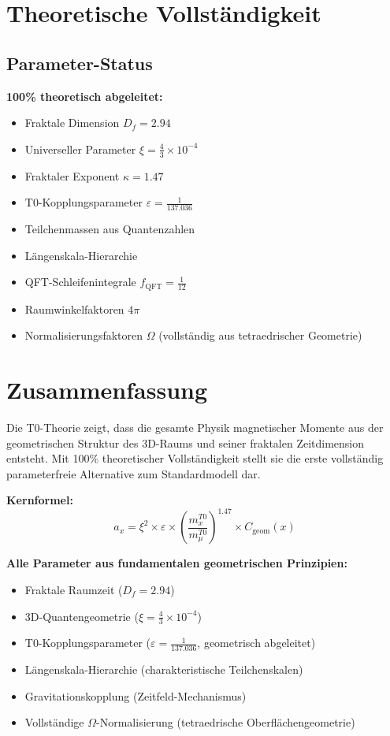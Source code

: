 \documentclass[12pt,a4paper]{article}
\numberwithin{equation}{section}
\newcommand{\xipar}{\xi}
\newcommand{\epsilonT}{\varepsilon}
\newcommand{\Cgeom}{C_{\text{geom}}}
\newcommand{\fQFT}{f_{\text{QFT}}}
\newcommand{\kappaT}{\kappa}
\newcommand{\Df}{D_f}
\newcommand{\Omegafactor}{\Omega}
\begin{document}
	\section{Theoretische Vollständigkeit}
	
	\subsection{Parameter-Status}
	
	\textbf{100\% theoretisch abgeleitet:}
	\begin{itemize}
		\item Fraktale Dimension $\Df = 2.94$
		\item Universeller Parameter $\xipar = \frac{4}{3} \times 10^{-4}$
		\item Fraktaler Exponent $\kappaT = 1.47$
		\item T0-Kopplungsparameter $\epsilonT = \frac{1}{137.036}$
		\item Teilchenmassen aus Quantenzahlen
		\item Längenskala-Hierarchie
		\item QFT-Schleifenintegrale $\fQFT = \frac{1}{12}$
		\item Raumwinkelfaktoren $4\pi$
		\item Normalisierungsfaktoren $\Omegafactor$ (vollständig aus tetraedrischer Geometrie)
	\end{itemize}
	
	\section{Zusammenfassung}
	
	Die T0-Theorie zeigt, dass die gesamte Physik magnetischer Momente aus der geometrischen Struktur des 3D-Raums und seiner fraktalen Zeitdimension entsteht. Mit 100\% theoretischer Vollständigkeit stellt sie die erste vollständig parameterfreie Alternative zum Standardmodell dar.
	
	\textbf{Kernformel:}
	\begin{equation}
		a_x = \xipar^2 \times \epsilonT \times \left(\frac{m_x^{T0}}{m_\mu^{T0}}\right)^{1.47} \times \Cgeom(x)
		\label{eq:core_formula}
	\end{equation}
	
	\textbf{Alle Parameter aus fundamentalen geometrischen Prinzipien:}
	\begin{itemize}
		\item Fraktale Raumzeit ($\Df = 2.94$)
		\item 3D-Quantengeometrie ($\xipar = \frac{4}{3} \times 10^{-4}$)
		\item T0-Kopplungsparameter ($\epsilonT = \frac{1}{137.036}$, geometrisch abgeleitet)
		\item Längenskala-Hierarchie (charakteristische Teilchenskalen)
		\item Gravitationskopplung (Zeitfeld-Mechanismus)
		\item Vollständige $\Omegafactor$-Normalisierung (tetraedrische Oberflächengeometrie)
	\end{itemize}
	
\end{document}
